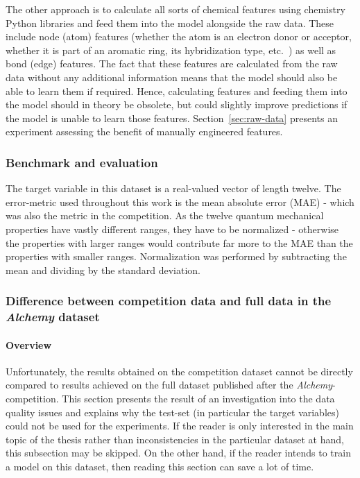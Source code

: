The other approach is to calculate all sorts of chemical features using chemistry Python libraries and feed them into the model alongside the raw data. These include node (atom) features (whether the atom is an electron donor or acceptor, whether it is part of an aromatic ring, its hybridization type, etc.~\cite{Organic-chemistry}) as well as bond (edge) features. The fact that these features are calculated from the raw data without any additional information means that the model should also be able to learn them if required. Hence, calculating features and feeding them into the model should in theory be obsolete, but could slightly improve predictions if the model is unable to learn those features. Section~\ref{sec:raw-data} presents an experiment assessing the benefit of manually engineered features.

\subsubsection{Benchmark and evaluation}

The target variable in this dataset is a real-valued vector of length twelve. The error-metric used throughout this work is the mean absolute error (MAE) - which was also the metric in the competition. As the twelve quantum mechanical properties have vastly different ranges, they have to be normalized - otherwise the properties with larger ranges would contribute far more to the MAE than the properties with smaller ranges. Normalization was performed by subtracting the mean and dividing by the standard deviation.

\subsubsection{Difference between competition data and full data in the \textit{Alchemy} dataset}
\label{sec:diff-old-new-ds}


\paragraph*{Overview} Unfortunately, the results obtained on the competition dataset cannot be directly compared to results achieved on the full dataset published after the \textit{Alchemy}-competition. This section presents the result of an investigation into the data quality issues and explains why the test-set (in particular the target variables) could not be used for the experiments. If the reader is only interested in the main topic of the thesis rather than inconsistencies in the particular dataset at hand, this subsection may be skipped. On the other hand, if the reader intends to train a model on this dataset, then reading this section can save a lot of time.

